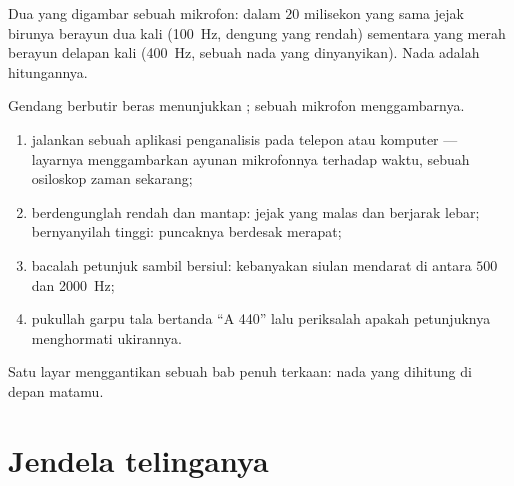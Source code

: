 \begin{omfigure}

{\small Dua  yang digambar sebuah mikrofon: dalam $20$
milisekon yang sama jejak birunya berayun dua kali (\qty{100}{Hz},
dengung yang rendah) sementara yang merah berayun delapan kali
(\qty{400}{Hz}, sebuah nada yang dinyanyikan). Nada adalah hitungannya.}
\end{omfigure}

\begin{method}\label{met:g8:sound-pitch-loudness:seeing}
Gendang berbutir beras menunjukkan  ; sebuah mikrofon
menggambarnya.
\begin{enumerate}
  \item jalankan sebuah aplikasi penganalisis  pada telepon atau
        komputer --- layarnya menggambarkan ayunan mikrofonnya
        terhadap waktu, sebuah osiloskop zaman sekarang;
  \item berdengunglah rendah dan mantap: jejak yang malas dan
        berjarak lebar; bernyanyilah tinggi: puncaknya berdesak
        merapat;
  \item bacalah petunjuk  sambil bersiul: kebanyakan
        siulan mendarat di antara $500$ dan \qty{2000}{Hz};
  \item pukullah garpu tala bertanda ``A 440'' lalu periksalah apakah
        petunjuknya menghormati ukirannya.
\end{enumerate}
Satu layar menggantikan sebuah bab penuh terkaan: nada yang dihitung
di depan matamu.
\end{method}

\section{Jendela telinganya}

